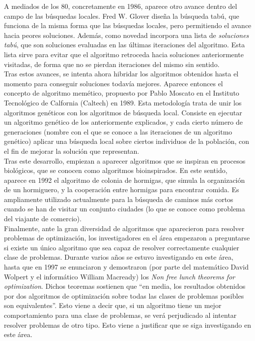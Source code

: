 \documentclass[12pt]{article} \usepackage[utf8x]{inputenc}
\begin{document}
A mediados de los 80, concretamente en 1986, aparece otro avance
dentro del campo de las búsquedas locales. Fred W. Glover diseña la
búsqueda tabú, que funciona de la misma forma que las búsquedas
locales, pero permitiendo el avance hacia peores soluciones. Además,
como novedad incorpora una lista de \textit{soluciones tabú}, que son
soluciones evaluadas en las últimas iteraciones del algoritmo. Esta
lista sirve para evitar que el algoritmo retroceda hacia soluciones
anteriormente visitadas, de forma que no se pierdan iteraciones
del mismo sin sentido.\\

Tras estos avances, se intenta ahora hibridar los algoritmos obtenidos
hasta el momento para conseguir soluciones todavía mejores. Aparece
entonces el concepto de algoritmo memético, propuesto por Pablo
Moscato en el Instituto Tecnológico de Calfornia (Caltech) en
1989. Esta metodología trata de unir los algoritmos genéticos con los
algoritmos de búsqueda local. Consiste en ejecutar un algoritmo
genético de los anteriormente explicados, y cada cierto número de
generaciones (nombre con el que se conoce a las iteraciones de un
algoritmo genético) aplicar una búsqueda local sobre ciertos
individuos de la población, con el fin
de mejorar la solución que representan.\\

Tras este desarrollo, empiezan a aparecer algoritmos que se inspiran
en procesos biológicos, que se conocen como algoritmos bioinspirados.
En este sentido, aparece en 1992 el algoritmo de colonia de hormigas,
que simula la organización de un hormiguero, y la cooperación entre
hormigas para encontrar comida. Es ampliamente utilizado actualmente
para la búsqueda de caminos más cortos cuando se han de visitar un
conjunto ciudades (lo que se conoce como problema del viajante de
comercio).\\

Finalmente, ante la gran diversidad de algoritmos que aparecieron para
resolver problemas de optimización, los investigadores en el área
empezaron a preguntarse si existe un único algoritmo que sea capaz de
resolver correctamente cualquier clase de problemas. Durante varios
años se estuvo investigando en este área, hasta que en 1997 se
enunciaron y demostraron (por parte del matemático David Wolpert y el
informático William Macready) los \textit{Non free lunch theorems for
  optimization}. Dichos teoremas sostienen que ``en media, los
resultados obtenidos por dos algoritmos de optimización sobre todas
las clases de problemas posibles son equivalentes''. Esto viene a
decir que, si un algoritmo tiene un mejor comportamiento para una
clase de problemas, se verá perjudicado al intentar resolver problemas
de otro tipo. Esto viene a justificar que se siga investigando en este
área.
\end{document}
